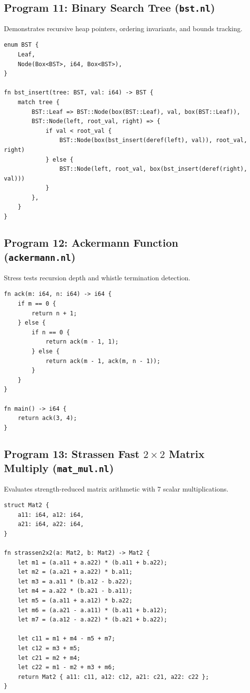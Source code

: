 \subsection{Program 11: Binary Search Tree (\texttt{bst.nl})}
Demonstrates recursive heap pointers, ordering invariants, and bounds tracking.

\begin{lstlisting}[language=NumLang, caption={Binary Search Tree in NumLang.}]
enum BST {
    Leaf,
    Node(Box<BST>, i64, Box<BST>),
}

fn bst_insert(tree: BST, val: i64) -> BST {
    match tree {
        BST::Leaf => BST::Node(box(BST::Leaf), val, box(BST::Leaf)),
        BST::Node(left, root_val, right) => {
            if val < root_val {
                BST::Node(box(bst_insert(deref(left), val)), root_val, right)
            } else {
                BST::Node(left, root_val, box(bst_insert(deref(right), val)))
            }
        },
    }
}
\end{lstlisting}

\subsection{Program 12: Ackermann Function (\texttt{ackermann.nl})}
Stress tests recursion depth and whistle termination detection.

\begin{lstlisting}[language=NumLang, caption={Ackermann-Péter Function in NumLang.}]
fn ack(m: i64, n: i64) -> i64 {
    if m == 0 {
        return n + 1;
    } else {
        if n == 0 {
            return ack(m - 1, 1);
        } else {
            return ack(m - 1, ack(m, n - 1));
        }
    }
}

fn main() -> i64 {
    return ack(3, 4);
}
\end{lstlisting}

\subsection{Program 13: Strassen Fast $2 \times 2$ Matrix Multiply (\texttt{mat\_mul.nl})}
Evaluates strength-reduced matrix arithmetic with 7 scalar multiplications.

\begin{lstlisting}[language=NumLang, caption={Strassen Matrix Multiplication in NumLang.}]
struct Mat2 {
    a11: i64, a12: i64,
    a21: i64, a22: i64,
}

fn strassen2x2(a: Mat2, b: Mat2) -> Mat2 {
    let m1 = (a.a11 + a.a22) * (b.a11 + b.a22);
    let m2 = (a.a21 + a.a22) * b.a11;
    let m3 = a.a11 * (b.a12 - b.a22);
    let m4 = a.a22 * (b.a21 - b.a11);
    let m5 = (a.a11 + a.a12) * b.a22;
    let m6 = (a.a21 - a.a11) * (b.a11 + b.a12);
    let m7 = (a.a12 - a.a22) * (b.a21 + b.a22);
    
    let c11 = m1 + m4 - m5 + m7;
    let c12 = m3 + m5;
    let c21 = m2 + m4;
    let c22 = m1 - m2 + m3 + m6;
    return Mat2 { a11: c11, a12: c12, a21: c21, a22: c22 };
}
\end{lstlisting}

